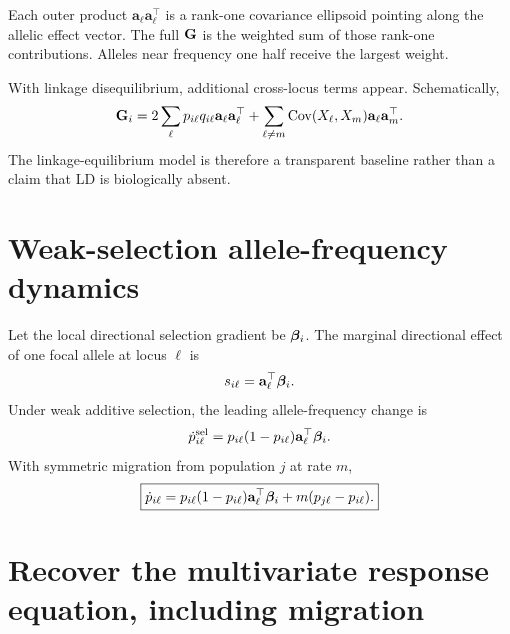 \begin{geombox}
Each outer product \(\mathbf a_\ell\mathbf a_\ell^\top\) is a rank-one covariance ellipsoid pointing along the allelic effect vector. The full \(\mathbf{G}\) is the weighted sum of those rank-one contributions. Alleles near frequency one half receive the largest weight.
\end{geombox}

With linkage disequilibrium, additional cross-locus terms appear. Schematically,
\begin{equation}
\mathbf{G}_i
=2\sum_\ell p_{i\ell}q_{i\ell}\mathbf a_\ell\mathbf a_\ell^\top
+\sum_{\ell\neq m}\operatorname{Cov}(X_\ell,X_m)\mathbf a_\ell\mathbf a_m^\top.
\end{equation}
The linkage-equilibrium model is therefore a transparent baseline rather than a claim that LD is biologically absent.

\section{Weak-selection allele-frequency dynamics}

Let the local directional selection gradient be \(\boldsymbol{\beta}_i\). The marginal directional effect of one focal allele at locus \(\ell\) is
\begin{equation}
s_{i\ell}=\mathbf a_\ell^\top\boldsymbol{\beta}_i.
\end{equation}
Under weak additive selection, the leading allele-frequency change is
\begin{equation}
\dot p_{i\ell}^{\mathrm{sel}}
=p_{i\ell}(1-p_{i\ell})\mathbf a_\ell^\top\boldsymbol{\beta}_i.
\label{eq:alleleSelectionDynamics}
\end{equation}
With symmetric migration from population \(j\) at rate \(m\),
\begin{equation}
\boxed{
\dot p_{i\ell}
=p_{i\ell}(1-p_{i\ell})\mathbf a_\ell^\top\boldsymbol{\beta}_i
+m(p_{j\ell}-p_{i\ell}).}
\label{eq:alleleDynamicsMigration}
\end{equation}

\section{Recover the multivariate response equation, including migration}

